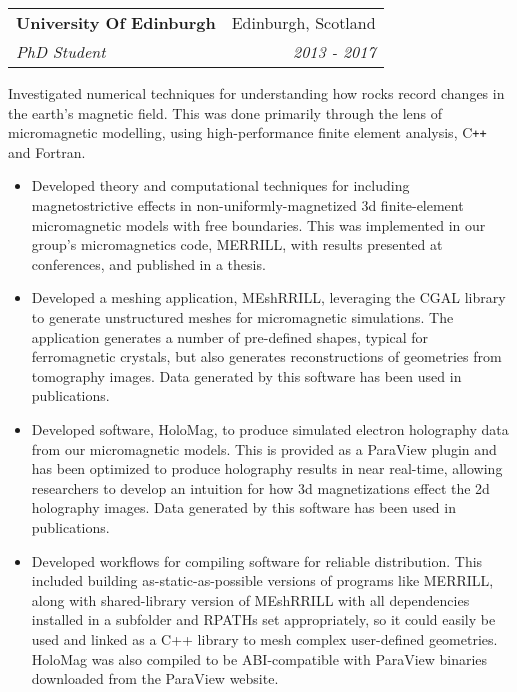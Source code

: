 \documentclass[11pt]{article}
\makeatletter
\newenvironment{resumeSubSectionHeader}{
    \par
    \begin{tabular*}{\textwidth}{l@{\extracolsep{\fill}}r}
    \par
} {
    \end{tabular*}
    \par
}
\newenvironment{resumeSubSectionBody}{
    \par
    \vspace{-0.2\parskip}
    \begin{small}
    \par
} {
    \par
    \end{small}
    \par
}
\newenvironment{resumeItemize}{
    \vspace{-0.5\baselineskip}
    \begin{itemize}
} {
    \end{itemize}
}
\makeatother
\begin{document}
%
%
\begin{resumeSubSectionHeader}

    \textbf{University Of Edinburgh}   & Edinburgh, Scotland \\
    \emph{PhD Student}                 & \emph{2013 - 2017}

\end{resumeSubSectionHeader}
\begin{resumeSubSectionBody}

    Investigated numerical techniques for understanding how rocks record
    changes in the earth's magnetic field. This was done primarily through
    the lens of micromagnetic modelling, using high-performance finite element
    analysis, C\verb!++! and Fortran.

    \begin{resumeItemize}
        \item
            Developed theory and computational techniques for including
            magnetostrictive effects in non-uniformly-magnetized 3d
            finite-element micromagnetic models with free boundaries.
            This was implemented in our group's micromagnetics code, MERRILL,
            with results presented at conferences, and published in a thesis.

        \item
            Developed a meshing application, MEshRRILL, leveraging the CGAL
            library to generate unstructured meshes for micromagnetic
            simulations.
            The application generates a number of pre-defined shapes, typical
            for ferromagnetic crystals, but also generates reconstructions of
            geometries from tomography images.
            Data generated by this software has been used in publications.

        \item
            Developed software, HoloMag, to produce simulated electron
            holography data from our micromagnetic models.
            This is provided as a ParaView plugin and has been optimized to
            produce holography results in near real-time, allowing researchers
            to develop an intuition for how 3d magnetizations effect the 2d
            holography images.
            Data generated by this software has been used in publications.

        \item
            Developed workflows for compiling software for reliable distribution.
            This included building as-static-as-possible versions of programs like MERRILL,
            along with shared-library version of MEshRRILL with all dependencies
            installed in a subfolder and RPATHs set appropriately, so it could
            easily be used and linked as a C++ library to mesh complex
            user-defined geometries.
            HoloMag was also compiled to be ABI-compatible with ParaView
            binaries downloaded from the ParaView website.
    \end{resumeItemize}

\end{resumeSubSectionBody}
\end{document}
